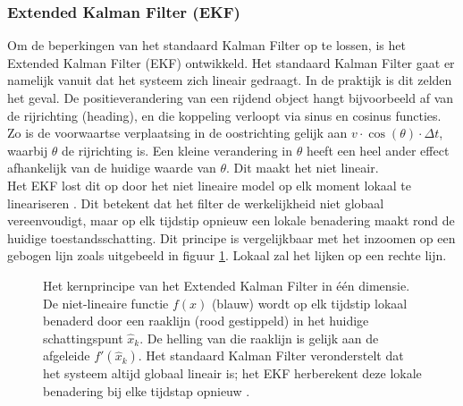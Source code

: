 \subsubsection{Extended Kalman Filter (EKF)}

Om de beperkingen van het standaard Kalman Filter op te lossen, is het Extended Kalman Filter (EKF) ontwikkeld. Het standaard Kalman Filter gaat er namelijk vanuit dat het systeem zich lineair gedraagt. In de praktijk is dit zelden het geval. De positieverandering van een rijdend object hangt bijvoorbeeld af van de rijrichting (heading), en die koppeling verloopt via sinus en cosinus functies. Zo is de voorwaartse verplaatsing in de oostrichting gelijk aan $v \cdot \cos(\theta) \cdot \Delta t$, waarbij $\theta$ de rijrichting is. Een kleine verandering in $\theta$ heeft een heel ander effect afhankelijk van de huidige waarde van $\theta$. Dit maakt het niet lineair. \\

Het EKF lost dit op door het niet lineaire model op elk moment lokaal te lineariseren \cite{vectornav_ekf}. Dit betekent dat het filter de werkelijkheid niet globaal vereenvoudigt, maar op elk tijdstip opnieuw een lokale benadering maakt rond de huidige toestandsschatting. Dit principe is vergelijkbaar met het inzoomen op een gebogen lijn zoals uitgebeeld in figuur \ref{fig:ekf_linearisatie}. Lokaal zal het lijken op een rechte lijn. 

\begin{figure}[h]
\centering
{}

\vspace{0.5cm}
\caption{Het kernprincipe van het Extended Kalman Filter in één dimensie. De niet-lineaire functie $f(x)$ (blauw) wordt op elk tijdstip lokaal benaderd door een raaklijn (rood gestippeld) in het huidige schattingspunt $\hat{x}_k$. De helling van die raaklijn is gelijk aan de afgeleide $f'(\hat{x}_k)$. Het standaard Kalman Filter veronderstelt dat het systeem altijd globaal lineair is; het EKF herberekent deze lokale benadering bij elke tijdstap opnieuw \cite{bar_shalom_estimation}.}
\label{fig:ekf_linearisatie}
\end{figure}

